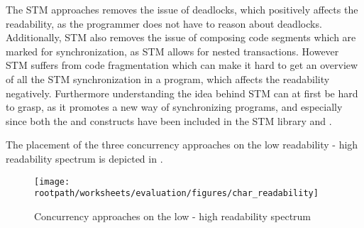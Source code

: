 The \ac{STM} approaches removes the issue of deadlocks, which positively affects the readability, as the programmer does not have to reason about deadlocks. Additionally, \ac{STM} also removes the issue of composing code segments which are marked for synchronization, as \ac{STM} allows for nested transactions. However \ac{STM} suffers from code fragmentation which can make it hard to get an overview of all the \ac{STM} synchronization in a program, which affects the readability negatively. Furthermore understanding the idea behind \ac{STM} can at first be hard to grasp, as it promotes a new way of synchronizing programs, and especially since both the  and  constructs have been included in the \ac{STM} library and \stmname.



The placement of the three concurrency approaches on the low readability - high readability spectrum is depicted in .


\begin{figure}[htbp]
\centering
 \texttt{[image: \\rootpath/worksheets/evaluation/figures/char\_readability]} 
 \caption{Concurrency approaches on the low - high readability spectrum}
\label{fig:char_readability}
\end{figure}

